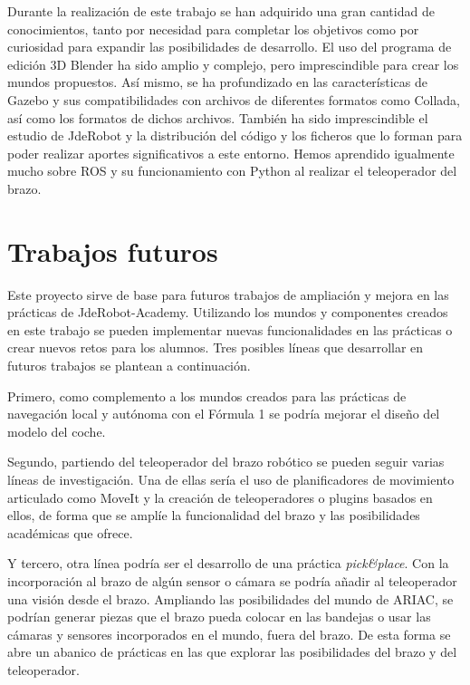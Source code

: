 Durante la realización de este trabajo se han adquirido una gran cantidad de conocimientos, tanto por necesidad para completar los objetivos como por curiosidad para expandir las posibilidades de desarrollo. El uso del programa de edición 3D Blender ha sido amplio y complejo, pero imprescindible para crear los mundos propuestos. Así mismo, se ha profundizado en las características de Gazebo y sus compatibilidades con archivos de diferentes formatos como Collada, así como los formatos de dichos archivos. También ha sido imprescindible el estudio de JdeRobot y la distribución del código y los ficheros que lo forman para poder realizar aportes significativos a este entorno. Hemos aprendido igualmente mucho sobre ROS y su funcionamiento con Python al realizar el teleoperador del brazo.


\section{Trabajos futuros}
\label{sec:cn_trabajosfuturos}

Este proyecto sirve de base para futuros trabajos de ampliación y mejora en las prácticas de JdeRobot-Academy. Utilizando los mundos y componentes creados en este trabajo se pueden implementar nuevas funcionalidades en las prácticas o crear nuevos retos para los alumnos. Tres posibles líneas que desarrollar en futuros trabajos se plantean a continuación.

Primero, como complemento a los mundos creados para las prácticas de navegación local y autónoma con el Fórmula 1 se podría mejorar el diseño del modelo del coche. 

Segundo, partiendo del teleoperador del brazo robótico se pueden seguir varias líneas de investigación. Una de ellas sería el uso de planificadores de movimiento articulado como MoveIt y la creación de teleoperadores o plugins basados en ellos, de forma que se amplíe la funcionalidad del brazo y las posibilidades académicas que ofrece. 

Y tercero, otra línea podría ser el desarrollo de una práctica \textit{pick\&place}. Con la incorporación al brazo de algún sensor o cámara se podría añadir al teleoperador una visión desde el brazo. Ampliando las posibilidades del mundo de ARIAC, se podrían generar piezas que el brazo pueda colocar en las bandejas o usar las cámaras y sensores incorporados en el mundo, fuera del brazo. De esta forma se abre un abanico de prácticas en las que explorar las posibilidades del brazo y del teleoperador.




